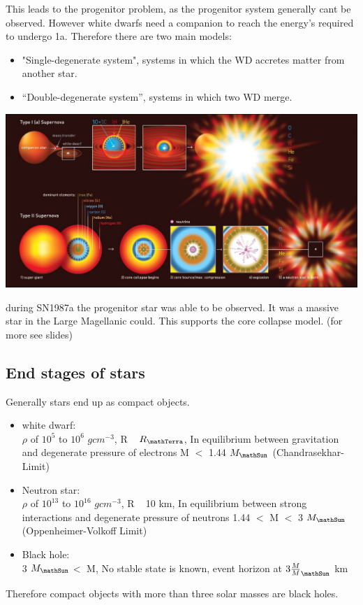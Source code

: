 \documentclass[11pt,a4paper]{article}
\begin{document}
This leads to the progenitor problem, as the progenitor system generally cant be observed. 
However white dwarfs need a companion to reach the energy's required to undergo 1a. 
Therefore there are two main models:
\begin{itemize}
    \item "Single-degenerate system", systems in which the WD accretes matter from another star.
    \item “Double-degenerate system”, systems in which two WD merge. 
\end{itemize}
\begin{center}
    \includegraphics[width=0.9\linewidth]{screenshot_2024-01-24-105703.png}
\end{center}
during SN1987a the progenitor star was able to be observed. 
It was a massive star in the Large Magellanic could.
This supports the core collapse model. (for more see slides)

\subsection{End stages of stars}
Generally stars end up as compact objects. 
\begin{itemize}
    \item white dwarf: \\ 
    $\rho$ of $10^5$ to $10^6$ $gcm^{-3}$, R ~ $R_\mathTerra$, In equilibrium between gravitation and degenerate pressure of electrons
    M $<$ 1.44 $M_\mathSun$ (Chandrasekhar-Limit)
\item Neutron star:  \\ 
    $\rho$ of $10^{13}$ to $10^{16}$ $gcm^{-3}$, R ~ 10 km, In equilibrium between strong interactions and degenerate pressure of neutrons
   1.44 $<$ M $<$ 3 $M_\mathSun$ (Oppenheimer-Volkoff Limit)
\item Black hole: \\ 
    3 $M_\mathSun$$<$ M, No stable state  is known, event horizon at $3 \frac M M_\mathSun$ km
\end{itemize}
Therefore compact objects with more than three solar masses are black holes.
\end{document}
